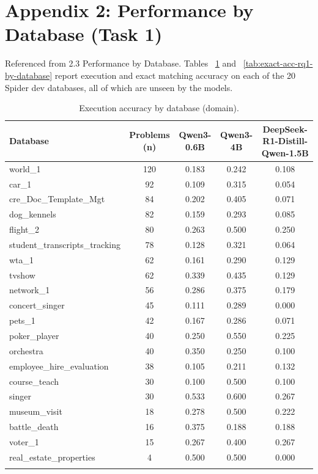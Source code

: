 \documentclass[11pt]{article}
\begin{document}
\section*{Appendix 2: Performance by Database (Task 1)}
\label{sec:appendix2}

Referenced from 2.3 Performance by Database. Tables ~\ref{tab:exec-acc-rq1-by-database} and ~\ref{tab:exact-acc-rq1-by-database} report execution and exact matching accuracy on each of the 20 Spider dev databases, all of which are unseen by the models.

\begin{table}[H]
\centering
\footnotesize
\caption{Execution accuracy by database (domain).}
\begin{tabular}{lcccc}
\toprule
Database & Problems (n) & Qwen3-0.6B & Qwen3-4B & DeepSeek-R1-Distill-Qwen-1.5B \\
\midrule
world\_1 & 120 & 0.183 & 0.242 & 0.108 \\
car\_1 & 92 & 0.109 & 0.315 & 0.054 \\
cre\_Doc\_Template\_Mgt & 84 & 0.202 & 0.405 & 0.071 \\
dog\_kennels & 82 & 0.159 & 0.293 & 0.085 \\
flight\_2 & 80 & 0.263 & 0.500 & 0.250 \\
student\_transcripts\_tracking & 78 & 0.128 & 0.321 & 0.064 \\
wta\_1 & 62 & 0.161 & 0.290 & 0.129 \\
tvshow & 62 & 0.339 & 0.435 & 0.129 \\
network\_1 & 56 & 0.286 & 0.375 & 0.179 \\
concert\_singer & 45 & 0.111 & 0.289 & 0.000 \\
pets\_1 & 42 & 0.167 & 0.286 & 0.071 \\
poker\_player & 40 & 0.250 & 0.550 & 0.225 \\
orchestra & 40 & 0.350 & 0.250 & 0.100 \\
employee\_hire\_evaluation & 38 & 0.105 & 0.211 & 0.132 \\
course\_teach & 30 & 0.100 & 0.500 & 0.100 \\
singer & 30 & 0.533 & 0.600 & 0.267 \\
museum\_visit & 18 & 0.278 & 0.500 & 0.222 \\
battle\_death & 16 & 0.375 & 0.188 & 0.188 \\
voter\_1 & 15 & 0.267 & 0.400 & 0.267 \\
real\_estate\_properties & 4 & 0.500 & 0.500 & 0.000 \\
\bottomrule
\label{tab:exec-acc-rq1-by-database}
\end{tabular}
\end{table}
\end{document}

